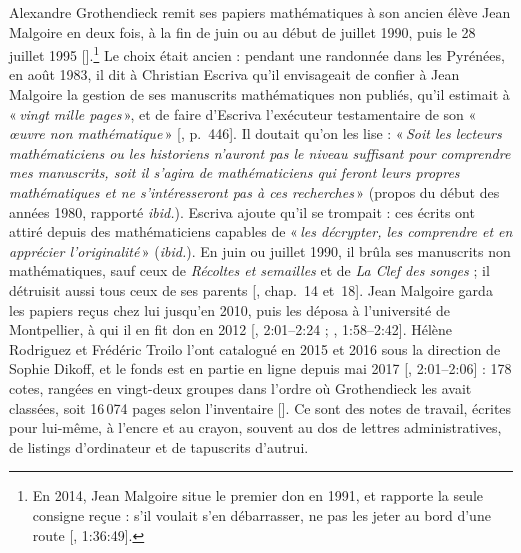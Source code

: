 \documentclass[11pt]{amsart}
\newcommand{\ts}[1]{\foreignlanguage{english}{#1}}
\newcommand{\q}[1]{«\,\textit{#1}\,»}
\begin{document}
Alexandre Grothendieck remit ses papiers mathématiques à son ancien élève Jean Malgoire en deux fois, à la fin de juin ou au début de juillet 1990, puis le 28 juillet 1995 [\citealp{montpellier}].\footnote{En 2014, Jean Malgoire situe le premier don en 1991, et rapporte la seule consigne reçue : s'il voulait s'en débarrasser, ne pas les jeter au bord d'une route [\citealp{toen2014}, \ts{1:36:49}].} Le choix était ancien : pendant une randonnée dans les Pyrénées, en août 1983, il dit à Christian Escriva qu'il envisageait de confier à Jean Malgoire la gestion de ses manuscrits mathématiques non publiés, qu'il estimait à \q{vingt mille pages}, et de faire d'Escriva l'exécuteur testamentaire de son \q{œuvre non mathématique} [\citealp{grothendieck2025}, p.~446]. Il doutait qu'on les lise : \q{Soit les lecteurs mathématiciens ou les historiens n'auront pas le niveau suffisant pour comprendre mes manuscrits, soit il s'agira de mathématiciens qui feront leurs propres mathématiques et ne s'intéresseront pas à ces recherches} (propos du début des années 1980, rapporté \emph{ibid.}). Escriva ajoute qu'il se trompait : ces écrits ont attiré depuis des mathématiciens capables de \q{les décrypter, les comprendre et en apprécier l'originalité} (\emph{ibid.}). En juin ou juillet 1990, il brûla ses manuscrits non mathématiques, sauf ceux de \emph{Récoltes et semailles} et de \emph{La Clef des songes} ; il détruisit aussi tous ceux de ses parents [\citealp{circle-spirit}, chap.~14 et~18]. Jean Malgoire garda les papiers reçus chez lui jusqu'en 2010, puis les déposa à l'université de Montpellier, à qui il en fit don en 2012 [\citealp{malgoire2017a}, \ts{2:01--2:24} ; \citealp{malgoire2017b}, \ts{1:58--2:42}]. Hélène Rodriguez et Frédéric Troilo l'ont catalogué en 2015 et 2016 sous la direction de Sophie Dikoff, et le fonds est en partie en ligne depuis mai 2017 [\citealp{malgoire2017b}, \ts{2:01--2:06}] : 178 cotes, rangées en vingt-deux groupes dans l'ordre où Grothendieck les avait classées, soit 16\,074 pages selon l'inventaire [\citealp{montpellier}]. Ce sont des notes de travail, écrites pour lui-même, à l'encre et au crayon, souvent au dos de lettres administratives, de listings d'ordinateur et de tapuscrits d'autrui.
\end{document}
